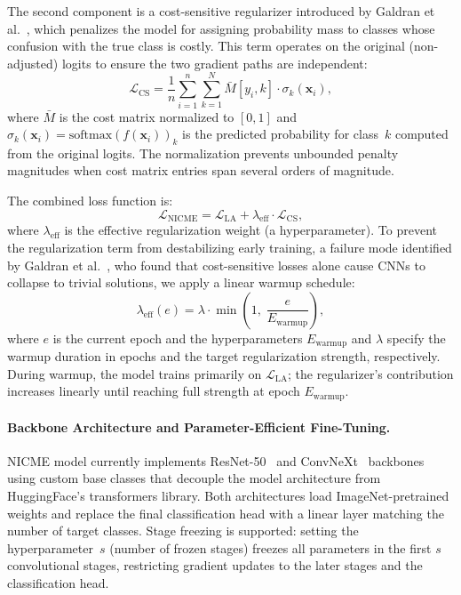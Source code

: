 \documentclass[11pt, letterpaper]{article}
\begin{document}
The second component is a cost-sensitive regularizer introduced by Galdran et
al.~\cite{galdran2020}, which penalizes the model for assigning probability
mass to classes whose confusion with the true class is costly. This term
operates on the original (non-adjusted) logits to ensure the two gradient paths
are independent:
%
\begin{equation}
\label{eq:cs_reg_nicme}
\mathcal{L}_{\mathrm{CS}} = \frac{1}{n} \sum_{i=1}^{n} \sum_{k=1}^{N}
  \bar{M}[y_i, k] \cdot \sigma_k(\mathbf{x}_i),
\end{equation}
%
where $\bar{M}$ is the cost matrix normalized to $[0, 1]$ and
$\sigma_k(\mathbf{x}_i) = \mathrm{softmax}(f(\mathbf{x}_i))_k$ is the
predicted probability for class~$k$ computed from the original logits. The
normalization prevents unbounded penalty magnitudes when cost matrix entries
span several orders of magnitude.

The combined loss function is:
%
\begin{equation}
\label{eq:combined_loss}
\mathcal{L}_{\mathrm{NICME}} = \mathcal{L}_{\mathrm{LA}}
  + \lambda_{\mathrm{eff}} \cdot \mathcal{L}_{\mathrm{CS}},
\end{equation}
%
where $\lambda_{\mathrm{eff}}$ is the effective regularization weight (a hyperparameter). To
prevent the regularization term from destabilizing early training, a failure
mode identified by Galdran et al.~\cite{galdran2020}, who found that
cost-sensitive losses alone cause CNNs to collapse to trivial solutions, we
apply a linear warmup schedule:
%
\begin{equation}
\label{eq:warmup}
\lambda_{\mathrm{eff}}(e) = \lambda \cdot \min\!\left(1,\;
  \frac{e}{E_{\mathrm{warmup}}}\right),
\end{equation}
%
where $e$ is the current epoch and the hyperparameters $E_{\mathrm{warmup}}$
and $\lambda$ specify the warmup duration in epochs and the target
regularization strength, respectively. During warmup, the
model trains primarily on $\mathcal{L}_{\mathrm{LA}}$; the regularizer's
contribution increases linearly until reaching full strength at epoch
$E_{\mathrm{warmup}}$.

\paragraph{Backbone Architecture and Parameter-Efficient Fine-Tuning.} 
NICME model currently implements ResNet-50~\cite{he2016resnet} and
ConvNeXt~\cite{liu2022convnext} backbones using custom base classes that
decouple the model architecture from HuggingFace's transformers library. Both
architectures load ImageNet-pretrained weights and replace the final
classification head with a linear layer matching the number of target classes.
Stage freezing is supported: setting the hyperparameter~$s$ (number of frozen stages) freezes
all parameters in the first $s$ convolutional stages, restricting gradient
updates to the later stages and the classification head.
\end{document}
